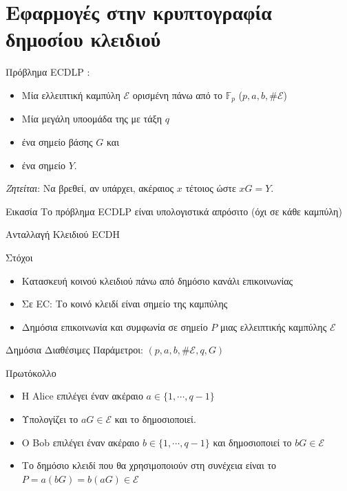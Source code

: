 \documentclass[handout]{beamer}
\begin{document}
\section{Εφαρμογές στην κρυπτογραφία δημοσίου κλειδιού}

\begin{frame}{Πρόβλημα ECDLP}
: 

\begin{itemize}
\item Μία ελλειπτική καμπύλη $\mathcal E$ ορισμένη πάνω από το $\mathbb{F}_p$ ($p,a,b,\# \mathcal E$)
\item Μία μεγάλη υποομάδα της με τάξη $q$ 
\item ένα σημείο βάσης $G$  και  
\item ένα σημείο  $Y$. 
\end{itemize}
\alert{\emph{Ζητείται}}:
Να βρεθεί, αν υπάρχει, ακέραιος $x$ τέτοιος ώστε $xG=Y$.

\pause
\begin{block}{Εικασία}
Το πρόβλημα ECDLP είναι υπολογιστικά απρόσιτο (όχι σε κάθε καμπύλη)
\end{block}

\end{frame}

\begin{frame}[allowframebreaks]{Ανταλλαγή Κλειδιού ECDH}
\begin{block}{Στόχοι}
\begin{itemize}
\item Κατασκευή κοινού κλειδιού πάνω από δημόσιο κανάλι επικοινωνίας
\item Σε EC: Το κοινό κλειδί είναι σημείο της καμπύλης
\item Δημόσια επικοινωνία και συμφωνία σε σημείο $P$  μιας ελλειπτικής καμπύλης $\mathcal E$
\end{itemize}
\end{block}

Δημόσια Διαθέσιμες Παράμετροι: $(p,a,b,\# \mathcal E,q,G)$
\framebreak
\begin{block}{Πρωτόκολλο}
\begin{itemize}
\item H {Alice} επιλέγει έναν ακέραιο $a \in \{1, \cdots, q-1 \}$
\item Υπολογίζει το $aG \in \mathcal E$ και το δημοσιοποιεί.
\item Ο {Bob} επιλέγει έναν ακέραιο $b \in \{1, \cdots, q-1 \}$ και δημοσιοποιεί το $bG \in \mathcal E$
\item Το δημόσιο κλειδί που θα χρησιμοποιούν στη συνέχεια είναι το $P=a(bG)=b(aG) \in \mathcal E$
\end{itemize}
\end{block}

\end{frame}
\end{document}
